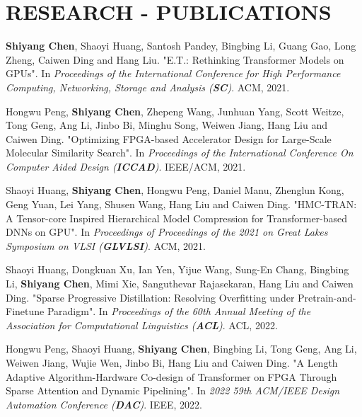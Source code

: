 \documentclass[12pt, a4paper]{article}
\newcommand{\years}[1]{\marginnote{#1}}
\begin{document}



\section*{RESEARCH - PUBLICATIONS}
\vspace{-2mm}

\years{2021} \textbf{Shiyang Chen}, Shaoyi Huang, Santosh Pandey, Bingbing Li, Guang Gao, Long Zheng, Caiwen Ding and Hang Liu. "E.T.: Rethinking Transformer Models on GPUs". In \textit{Proceedings of the International Conference for High Performance Computing, Networking, Storage and Analysis (\textbf{SC})}. ACM, 2021.

\vspace*{2mm}

\years{2021} Hongwu Peng, \textbf{Shiyang Chen}, Zhepeng Wang, Junhuan Yang, Scott Weitze, Tong Geng, Ang Li, Jinbo Bi, Minghu Song, Weiwen Jiang, Hang Liu and Caiwen Ding. "Optimizing FPGA-based Accelerator Design for Large-Scale Molecular Similarity Search". In \textit{Proceedings of the International Conference On Computer Aided Design (\textbf{ICCAD})}. IEEE/ACM, 2021.

\vspace*{2mm}

\years{2021} Shaoyi Huang, \textbf{Shiyang Chen}, Hongwu Peng, Daniel Manu, Zhenglun Kong, Geng Yuan, Lei Yang, Shusen Wang, Hang Liu and Caiwen Ding. "HMC-TRAN: A Tensor-core Inspired Hierarchical Model Compression for Transformer-based DNNs on GPU". In \textit{Proceedings of Proceedings of the 2021 on Great Lakes Symposium on VLSI (\textbf{GLVLSI})}. ACM, 2021.

\vspace*{2mm}

\years{2022} Shaoyi Huang, Dongkuan Xu, Ian Yen, Yijue Wang, Sung-En Chang, Bingbing Li, \textbf{Shiyang Chen}, Mimi Xie, Sanguthevar Rajasekaran, Hang Liu and Caiwen Ding. "Sparse Progressive Distillation: Resolving Overfitting under Pretrain-and-Finetune Paradigm". In \textit{Proceedings of the 60th Annual Meeting of the Association for Computational Linguistics (\textbf{ACL})}. ACL, 2022.

\vspace*{2mm}

\years{2022} Hongwu Peng, Shaoyi Huang, \textbf{Shiyang Chen}, Bingbing Li, Tong Geng, Ang Li, Weiwen Jiang, Wujie Wen, Jinbo Bi, Hang Liu and Caiwen Ding. "A Length Adaptive Algorithm-Hardware Co-design of Transformer on FPGA Through Sparse Attention and Dynamic Pipelining". In \textit{2022 59th ACM/IEEE Design Automation Conference (\textbf{DAC})}. IEEE, 2022.
\end{document}
